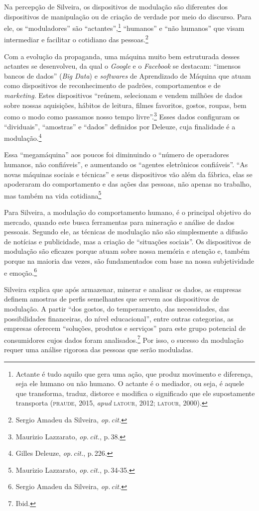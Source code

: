 Na percepção de Silveira, os dispositivos de modulação são
diferentes dos dispositivos de manipulação ou de criação de verdade por
meio do discurso. Para ele, os ``moduladores'' são
``actantes'',\footnote{Actante é tudo aquilo que gera uma ação, que
  produz movimento e diferença, seja ele humano ou não humano. O actante
  é o mediador, ou seja, é aquele que transforma, traduz, distorce e
  modifica o significado que ele supostamente transporta (\textsc{praude}, 2015,
  \emph{apud} \textsc{latour}, 2012; \textsc{latour}, 2000).} ``humanos'' e ``não humanos'' que visam intermediar e facilitar o cotidiano das pessoas.\footnote{Sergio Amadeu da Silveira, \textit{op.\,cit.}}

Com a evolução da propaganda, uma máquina muito bem estruturada desses
actantes se desenvolveu, da qual o \emph{Google} e o \emph{Facebook} se
destacam: ``imensos bancos de dados'' (\emph{Big Data}) e \emph{softwares} de
Aprendizado de Máquina que atuam como dispositivos de reconhecimento de
padrões, comportamentos e de \emph{marketing}. Estes dispositivos ``reúnem,
selecionam e vendem milhões de dados sobre nossas aquisições, hábitos de
leitura, filmes favoritos, gostos, roupas, bem como o modo como passamos
nosso tempo livre''.\footnote{Maurizio Lazzarato, \textit{op.\,cit.}, p.\,38.} Esses dados configuram os ``dividuais'', ``amostras'' e ``dados'' definidos por Deleuze, cuja
finalidade é a modulação.\footnote{Gilles Deleuze, \textit{op.\,cit.}, p.\,226.}

Essa ``megamáquina'' aos poucos foi diminuindo o ``número de operadores
humanos, não confiáveis'', e aumentando os ``agentes eletrônicos
confiáveis''. ``As novas máquinas sociais e técnicas'' e seus
dispositivos vão além da fábrica, elas se apoderaram do comportamento e
das ações das pessoas, não apenas no trabalho, mas também na vida
cotidiana\footnote{Maurizio Lazzarato, \textit{op.\,cit.}, p.\,34-35.}

Para Silveira, a modulação do comportamento humano, é o principal
objetivo do mercado, quando este busca ferramentas para mineração e
análise de dados pessoais. Segundo ele, as técnicas de modulação não são
simplesmente a difusão de notícias e publicidade, mas a criação de
``situações sociais''. Os dispositivos de modulação são eficazes porque
atuam sobre nossa memória e atenção e, também porque na maioria das
vezes, são fundamentados com base na nossa subjetividade e emoção.\footnote{Sergio Amadeu da Silveira, \textit{op.\,cit.}}

Silveira explica que após armazenar, minerar e analisar os dados,
as empresas definem amostras de perfis semelhantes que servem aos
dispositivos de modulação. A partir ``dos gostos, do temperamento, das
necessidades, das possibilidades financeiras, do nível educacional'',
entre outras categorias, as empresas oferecem ``soluções, produtos e
serviços'' para este grupo potencial de consumidores cujos dados foram
analisados.\footnote{Ibid.} Por isso, o sucesso da modulação requer uma
análise rigorosa das pessoas que serão moduladas.


